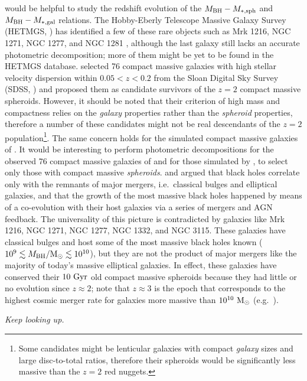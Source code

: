 would be helpful to study the redshift evolution of the $M_{\rm BH} - M_{\rm *,sph}$ 
and $M_{\rm BH} - M_{\rm *,gal}$ relations. 
The Hobby-Eberly Telescope Massive Galaxy Survey (HETMGS, \citealt{vandenBosch2015}) 
has identified a few of these rare objects 
such as Mrk 1216, NGC 1271, NGC 1277, and NGC 1281 \citep{yildirim2016}, 
although the last galaxy still lacks an accurate photometric decomposition; 
more of them might be yet to be found in the HETMGS database. 
\citet{saulder2015} selected 76 compact massive galaxies with high stellar velocity dispersion within $0.05 < z < 0.2$ 
from the Sloan Digital Sky Survey (SDSS, \citealt{abazajian2009}) 
and proposed them as candidate survivors of the $z=2$ compact massive spheroids. 
However, it should be noted that their criterion of high mass and compactness relies on the \emph{galaxy} properties 
rather than the \emph{spheroid} properties, 
therefore a number of these candidates might not be real descendants of the $z=2$ population\footnote{Some 
candidates might be lenticular galaxies with compact \emph{galaxy} sizes and large disc-to-total ratios, 
therefore their spheroids would be significantly less massive than the $z=2$ red nuggets. }. 
The same concern holds for the simulated compact massive galaxies of \citet{wellons2016}. 
It would be interesting to perform photometric decompositions 
for the observed 76 compact massive galaxies of \citet{saulder2015} 
and for those simulated by \citet{wellons2016}, 
to select only those with compact massive \emph{spheroids}. 
\citet{kormendy2011} and \citet{kormendyho2013} argued that black holes correlate only 
with the remnants of major mergers, i.e.~classical bulges and elliptical galaxies, 
and that the growth of the most massive black holes happened by means of a co-evolution with their host galaxies 
via a series of mergers and AGN feedback. 
The universality of this picture is contradicted by galaxies like Mrk 1216, NGC 1271, NGC 1277, NGC 1332, and NGC 3115. 
These galaxies have classical bulges and  
host some of the most massive black holes known ($10^9 \lesssim M_{\rm BH}/{\rm M_\odot} \lesssim 10^{10}$), 
but they are not the product of major mergers like the majority of today's massive elliptical galaxies. 
In effect, these galaxies have conserved their $10 \rm~Gyr$ old compact massive spheroids 
because they had little or no evolution since $z \approx 2$; 
note that $z \approx 3$ is the epoch that corresponds to the highest cosmic merger rate 
for galaxies more massive than $10^{10} \rm~M_\odot$ (e.g.~\citealt{conselice2008}). 


\vspace{5cm}
\begin{flushright}
\emph{Keep looking up. }
\end{flushright}

 
